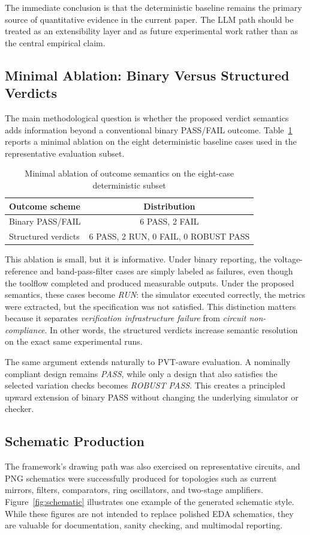 \documentclass[conference]{IEEEtran}
\begin{document}
The immediate conclusion is that the deterministic baseline remains the primary source of quantitative evidence in the current paper. The LLM path should be treated as an extensibility layer and as future experimental work rather than as the central empirical claim.

\subsection{Minimal Ablation: Binary Versus Structured Verdicts}
The main methodological question is whether the proposed verdict semantics adds information beyond a conventional binary PASS/FAIL outcome. Table~\ref{tab:ablation} reports a minimal ablation on the eight deterministic baseline cases used in the representative evaluation subset.

\begin{table}[t]
\caption{Minimal ablation of outcome semantics on the eight-case deterministic subset}
\label{tab:ablation}
\centering
\begin{tabular}{lc}
\toprule
Outcome scheme & Distribution \\
\midrule
Binary PASS/FAIL & 6 PASS, 2 FAIL \\
Structured verdicts & 6 PASS, 2 RUN, 0 FAIL, 0 ROBUST PASS \\
\bottomrule
\end{tabular}
\end{table}

This ablation is small, but it is informative. Under binary reporting, the voltage-reference and band-pass-filter cases are simply labeled as failures, even though the toolflow completed and produced measurable outputs. Under the proposed semantics, these cases become \emph{RUN}: the simulator executed correctly, the metrics were extracted, but the specification was not satisfied. This distinction matters because it separates \emph{verification infrastructure failure} from \emph{circuit non-compliance}. In other words, the structured verdicts increase semantic resolution on the exact same experimental runs.

The same argument extends naturally to PVT-aware evaluation. A nominally compliant design remains \emph{PASS}, while only a design that also satisfies the selected variation checks becomes \emph{ROBUST PASS}. This creates a principled upward extension of binary PASS without changing the underlying simulator or checker.

\subsection{Schematic Production}
The framework's drawing path was also exercised on representative circuits, and PNG schematics were successfully produced for topologies such as current mirrors, filters, comparators, ring oscillators, and two-stage amplifiers. Figure~\ref{fig:schematic} illustrates one example of the generated schematic style. While these figures are not intended to replace polished EDA schematics, they are valuable for documentation, sanity checking, and multimodal reporting.
\end{document}
